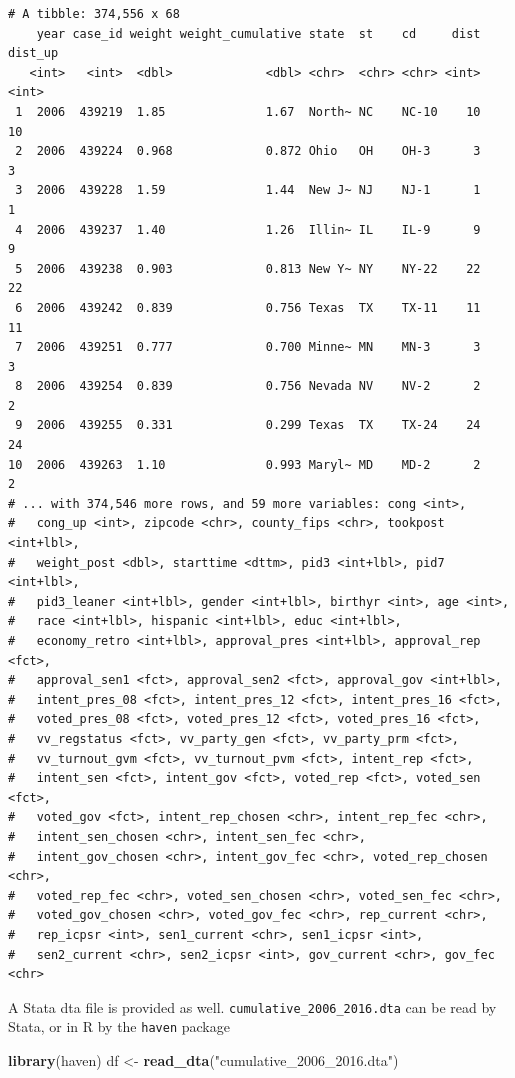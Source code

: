 \documentclass[10pt,article,oneside]{memoir}
\theoremstyle{definition}
\newenvironment{Shaded}{\begin{snugshade}}{\end{snugshade}}
\newcommand{\KeywordTok}[1]{\textcolor[rgb]{0.13,0.29,0.53}{\textbf{#1}}}
\newcommand{\StringTok}[1]{\textcolor[rgb]{0.31,0.60,0.02}{#1}}
\newcommand{\NormalTok}[1]{#1}
\begin{document}
\begin{verbatim}
# A tibble: 374,556 x 68
    year case_id weight weight_cumulative state  st    cd     dist dist_up
   <int>   <int>  <dbl>             <dbl> <chr>  <chr> <chr> <int>   <int>
 1  2006  439219  1.85              1.67  North~ NC    NC-10    10      10
 2  2006  439224  0.968             0.872 Ohio   OH    OH-3      3       3
 3  2006  439228  1.59              1.44  New J~ NJ    NJ-1      1       1
 4  2006  439237  1.40              1.26  Illin~ IL    IL-9      9       9
 5  2006  439238  0.903             0.813 New Y~ NY    NY-22    22      22
 6  2006  439242  0.839             0.756 Texas  TX    TX-11    11      11
 7  2006  439251  0.777             0.700 Minne~ MN    MN-3      3       3
 8  2006  439254  0.839             0.756 Nevada NV    NV-2      2       2
 9  2006  439255  0.331             0.299 Texas  TX    TX-24    24      24
10  2006  439263  1.10              0.993 Maryl~ MD    MD-2      2       2
# ... with 374,546 more rows, and 59 more variables: cong <int>,
#   cong_up <int>, zipcode <chr>, county_fips <chr>, tookpost <int+lbl>,
#   weight_post <dbl>, starttime <dttm>, pid3 <int+lbl>, pid7 <int+lbl>,
#   pid3_leaner <int+lbl>, gender <int+lbl>, birthyr <int>, age <int>,
#   race <int+lbl>, hispanic <int+lbl>, educ <int+lbl>,
#   economy_retro <int+lbl>, approval_pres <int+lbl>, approval_rep <fct>,
#   approval_sen1 <fct>, approval_sen2 <fct>, approval_gov <int+lbl>,
#   intent_pres_08 <fct>, intent_pres_12 <fct>, intent_pres_16 <fct>,
#   voted_pres_08 <fct>, voted_pres_12 <fct>, voted_pres_16 <fct>,
#   vv_regstatus <fct>, vv_party_gen <fct>, vv_party_prm <fct>,
#   vv_turnout_gvm <fct>, vv_turnout_pvm <fct>, intent_rep <fct>,
#   intent_sen <fct>, intent_gov <fct>, voted_rep <fct>, voted_sen <fct>,
#   voted_gov <fct>, intent_rep_chosen <chr>, intent_rep_fec <chr>,
#   intent_sen_chosen <chr>, intent_sen_fec <chr>,
#   intent_gov_chosen <chr>, intent_gov_fec <chr>, voted_rep_chosen <chr>,
#   voted_rep_fec <chr>, voted_sen_chosen <chr>, voted_sen_fec <chr>,
#   voted_gov_chosen <chr>, voted_gov_fec <chr>, rep_current <chr>,
#   rep_icpsr <int>, sen1_current <chr>, sen1_icpsr <int>,
#   sen2_current <chr>, sen2_icpsr <int>, gov_current <chr>, gov_fec <chr>
\end{verbatim}

A Stata dta file is provided as well.
\texttt{cumulative\_2006\_2016.dta} can be read by Stata, or in R by the
\texttt{haven} package

\begin{Shaded}
\begin{Highlighting}[]
\KeywordTok{library}\NormalTok{(haven)}
\NormalTok{df <-}\StringTok{ }\KeywordTok{read_dta}\NormalTok{(}\StringTok{"cumulative_2006_2016.dta"}\NormalTok{)}
\end{Highlighting}
\end{Shaded}
\end{document}
